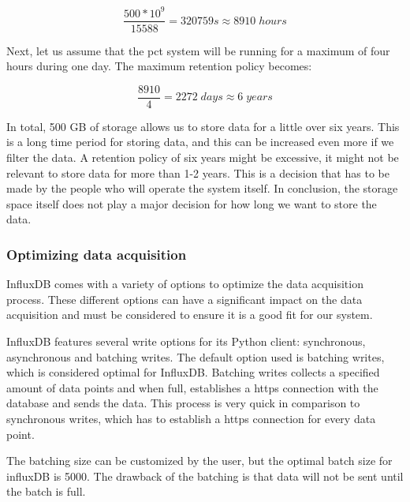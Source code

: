 \documentclass[main.tex]{subfiles}
\begin{document}
\begin{equation} \label{eqn:total_bytes_total}
\frac{500 * 10^9}{15588} = 320759s \approx 8910\; hours
\end{equation}

Next, let us assume that the \gls{pct} system will be running for a maximum of four hours during one day. The maximum retention policy becomes:

\begin{equation} \label{eqn:total_retention}
\frac{8910}{4} = 2272\; days \approx 6\; years
\end{equation}

In total, 500 GB of storage allows us to store data for a little over six years. This is a long time period for storing data, and this can be increased even more if we filter the data. A retention policy of six years might be excessive, it might not be relevant to store data for more than 1-2 years. This is a decision that has to be made by the people who will operate the system itself. In conclusion, the storage space itself does not play a major decision for how long we want to store the data.



\subsubsection{Optimizing data acquisition}

InfluxDB comes with a variety of options to optimize the data acquisition process. These different options can have a significant impact on the data acquisition and must be considered to ensure it is a good fit for our system.

InfluxDB features several write options for its Python client: synchronous, asynchronous and batching writes. The default option used is batching writes, which is considered optimal for InfluxDB. Batching writes collects a specified amount of data points and when full, establishes a https connection with the database and sends the data. This process is very quick in comparison to synchronous writes, which has to establish a https connection for every data point.

The batching size can be customized by the user, but the optimal batch size for influxDB is 5000\cite{influx_batching}. The drawback of the batching is that data will not be sent until the batch is full.
\end{document}
